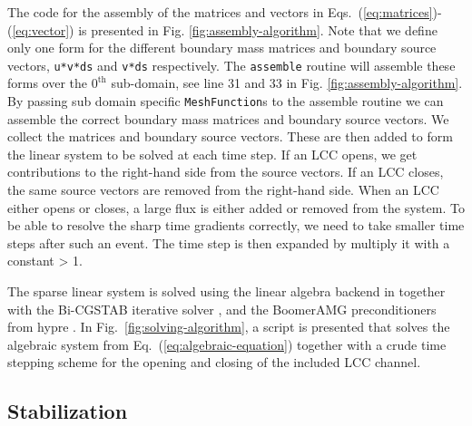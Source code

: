 The \pydolfin code for the assembly of the matrices and vectors in Eqs.~(\ref{eq:matrices})-(\ref{eq:vector}) is presented in Fig. \ref{fig:assembly-algorithm}. Note that we define only one form for the different boundary mass matrices and boundary source vectors, \texttt{u*v*ds} and \texttt{v*ds} respectively. The \texttt{assemble} routine will assemble these forms over the $0^{\scriptscriptstyle\text{th}}$ sub-domain, see line 31 and 33 in Fig. \ref{fig:assembly-algorithm}. By passing sub domain specific \texttt{MeshFunction}s to the assemble routine we can assemble the correct boundary mass matrices and boundary source vectors. We collect the matrices and boundary source vectors. These are then added to form the linear system to be solved at each time step. If an LCC opens, we get contributions to the right-hand side from the source vectors. If an LCC closes, the same source vectors are removed from the right-hand side. When an LCC either opens or closes, a large flux is either added or removed from the system. To be able to resolve the sharp time gradients correctly, we need to take smaller time steps after such an event. The time step is then expanded by multiply it with a constant > 1.\par

The sparse linear system is solved using the \petsc linear algebra backend \cite{BalayBuschelmanGroppEtAl2001} in \pydolfin together with the Bi-CGSTAB iterative solver \cite{Vorst1992}, and the BoomerAMG preconditioners from hypre \cite{FalgoutYang2002}. In Fig.~\ref{fig:solving-algorithm}, a script is presented that solves the algebraic system from Eq.~(\ref{eq:algebraic-equation}) together with a crude time stepping scheme for the opening and closing of the included LCC channel.\par

\subsection*{Stabilization}
\label{sec:stabilization}

